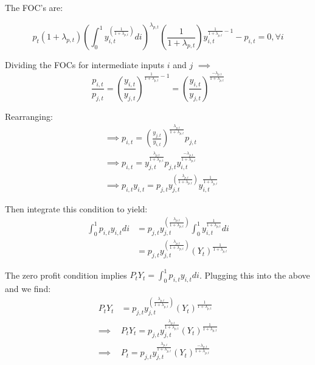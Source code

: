 \documentclass[article,11pt,letterpaper,fleqn]{article}
\theoremstyle{definition}
\numberwithin{equation}{section}
\begin{document}
The FOC's are:

\begin{equation}
p_{t}(1+\lambda_{p,t})\left(\int_{0}^{1}y_{i,t}^{\left(\frac{1}{1+\lambda_{p,t}}\right)}di\right)^{\lambda_{p,t}}\left(\frac{1}{1+\lambda_{p,t}}\right)y_{i,t}^{\frac{1}{1+\lambda_{p,t}}-1}-p_{i,t} = 0, \forall i
\end{equation}

Dividing the FOCs for intermediate inputs $i$ and $j$ $\implies$
\begin{equation}
\frac{p_{i,t}}{p_{j,t}} = \left(\frac{y_{i,t}}{y_{j,t}}\right)^{\frac{1}{1+\lambda_{p,t}}-1} = \left(\frac{y_{i,t}}{y_{j,t}}\right)^{\frac{-\lambda_{p,t}}{1+\lambda_{p,t}}}
\end{equation}

Rearranging:
\begin{equation}
\begin{split}
&\implies p_{i,t} = \left(\frac{y_{j,t}}{y_{i,t}}\right)^{\frac{\lambda_{p,t}}{1+\lambda_{p,t}}}p_{j,t} \\
& \implies p_{i,t} = y_{j,t}^{\frac{\lambda_{p,t}}{1+\lambda_{p,t}}}p_{j,t}y_{i,t}^{\frac{-\lambda_{p,t}}{1+\lambda_{p,t}}} \\
& \implies p_{i,t}y_{i,t} = p_{j,t}y_{j,t}^{\left(\frac{\lambda_{p,t}}{1+\lambda_{p,t}}\right)}y_{i,t}^{\frac{1}{1+\lambda_{p,t}}}
\end{split}
\end{equation}

Then integrate this condition to yield:
\begin{equation}
\begin{split}
\int_{0}^{1}p_{i,t}y_{i,t}di & = p_{j,t}y_{j,t}^{\left(\frac{\lambda_{p,t}}{1+\lambda_{p,t}}\right)}\int_{0}^{1}y_{i,t}^{\frac{1}{1+\lambda_{p,t}}}di  \\
& = p_{j,t}y_{j,t}^{\left(\frac{\lambda_{p,t}}{1+\lambda_{p,t}}\right)}(Y_{t})^{\frac{1}{1+\lambda_{p,t}}} 
\end{split}
\end{equation}

The zero profit condition implies $P_{t}Y_{t}=\int_{0}^{1}p_{i,t}y_{i,t}di$.  Plugging this into the above and we find:
\begin{equation}
\begin{split}
P_{t}Y_{t} &= p_{j,t}y_{j,t}^{\left(\frac{\lambda_{p,t}}{1+\lambda_{p,t}}\right)}(Y_{t})^{\frac{1}{1+\lambda_{p,t}}} \\
\implies &P_{t}Y_{t}=p_{j,t}y_{j,t}^{\frac{\lambda_{p,t}}{1+\lambda_{p,t}}}(Y_{t})^{\frac{1}{1+\lambda_{p,t}}} \\
\implies & P_{t} =  p_{j,t}y_{j,t}^{\frac{\lambda_{p,t}}{1+\lambda_{p,t}}}(Y_{t})^{\frac{-\lambda_{p,t}}{1+\lambda_{p,t}}}
\end{split}
\end{equation}
\end{document}
